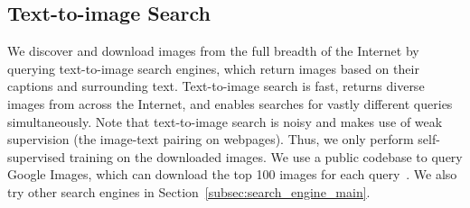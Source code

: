 \subsection{Text-to-image Search}
\label{subsec:text_to_image_search}
We discover and download images from the full breadth of the Internet by querying text-to-image search engines, which return images based on their captions and surrounding text. Text-to-image search is fast, returns diverse images from across the Internet, and enables searches for vastly different queries simultaneously. Note that text-to-image search is noisy and makes use of weak supervision (the image-text pairing on webpages). Thus, we only perform self-supervised training on the downloaded images. We use a public codebase to query Google Images, which can download the top 100 images for each query~\cite{hardikvasa, Joeclinton1}. We also try other search engines in Section~\ref{subsec:search_engine_main}.

